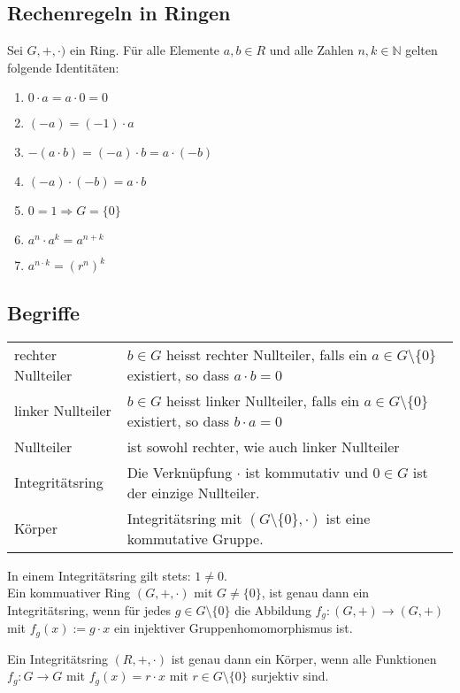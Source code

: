 \subsection{Rechenregeln in Ringen}
Sei $G, +, \cdot)$ ein Ring. Für alle Elemente $a, b \in R$ und alle Zahlen $n, k \in \mathbb{N}$ gelten folgende Identitäten:
\begin{enumerate}
	\item $0 \cdot a = a \cdot 0 = 0$
	\item $(- a) = (-1) \cdot a$
	\item $- (a \cdot b) = (- a) \cdot b = a \cdot (-b)$
	\item $(- a) \cdot (- b) = a \cdot b$
	\item $0 = 1 \Rightarrow G = \{0\}$
	\item $a^n \cdot a^k = a^{n + k}$
	\item $a^{n \cdot k} = (r^n)^k$
\end{enumerate}

\subsection{Begriffe}
\settowidth{\MyLenA}{rechter Nullteiler~~}
\begin{tabular}{@{}p{\the\MyLenA}%
				@{}p{(\linewidth - \the\MyLenA)}}
	rechter Nullteiler & $b \in G$ heisst rechter Nullteiler, falls ein $a \in G\setminus\{0\}$ existiert, so dass $a \cdot b = 0$\\
	linker Nullteiler & $b \in G$ heisst linker Nullteiler, falls ein $a \in G\setminus\{0\}$ existiert, so dass $b \cdot a = 0$\\
	Nullteiler & ist sowohl rechter, wie auch linker Nullteiler\\
	Integritätsring & Die Verknüpfung $\cdot$ ist kommutativ und $0 \in G$ ist der einzige Nullteiler.\\
	Körper & Integritätsring mit $(G\setminus \{0\}, \cdot)$ ist eine kommutative Gruppe.
\end{tabular}

In einem Integritätsring gilt stets: $1 \neq 0$.\\

Ein kommuativer Ring $(G, +, \cdot)$ mit $G \neq \{0\}$, ist genau dann ein Integritätsring, wenn für jedes $g \in G\setminus\{0\}$ die Abbildung $f_g: (G, +) \rightarrow (G, +)$ mit $f_g(x) := g \cdot x$ ein injektiver Gruppenhomomorphismus ist.

Ein Integritätsring $(R, +, \cdot)$ ist genau dann ein Körper, wenn alle Funktionen $f_g: G \rightarrow G$ mit $f_g(x) = r \cdot x$ mit $r \in G\setminus\{0\}$ surjektiv sind.

